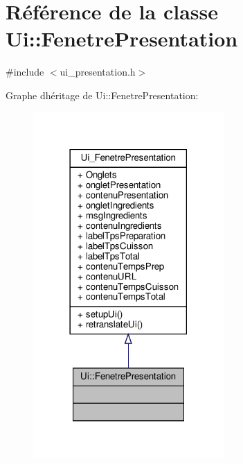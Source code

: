 \hypertarget{class_ui_1_1_fenetre_presentation}{}\section{Référence de la classe Ui\+:\+:Fenetre\+Presentation}
\label{class_ui_1_1_fenetre_presentation}


{\ttfamily \#include $<$ui\+\_\+presentation.\+h$>$}



Graphe d\textquotesingle{}héritage de Ui\+:\+:Fenetre\+Presentation\+:
\nopagebreak
\begin{figure}[H]
\begin{center}
\leavevmode
\includegraphics[width=206pt]{class_ui_1_1_fenetre_presentation__inherit__graph}
\end{center}
\end{figure}


